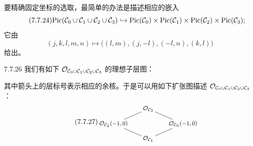 要精确固定坐标的选取，最简单的办法是描述相应的嵌入
\begin{equation}\tag{7.7.24}\label{eq:a4-7-7-24}
\mathrm{Pic}(\mathcal{C}_0\cup\mathcal{C}_1\cup\mathcal{C}_2\cup\mathcal{C}_3)\hookrightarrow\mathrm{Pic}(\mathcal{C}_0)\times\mathrm{Pic}(\mathcal{C}_1)\times\mathrm{Pic}(\mathcal{C}_2)\times\mathrm{Pic}(\mathcal{C}_3);
\end{equation}
它由
\begin{equation}\tag{7.7.25}\label{eq:a4-7-7-25}
(j,k,l,m,n)\mapsto\bigl((l,m),(j,-l),(-l,n),(k,l)\bigr)
\end{equation}
给出。

\begin{exam}{7.7.26}\label{thm:a4-7-7-26}
我们有如下 $\mathcal{O}_{\mathcal{C}_0\cup\mathcal{C}_1\cup\mathcal{C}_2\cup\mathcal{C}_3}$ 的理想子层图：
\begin{center}
\end{center}
其中箭头上的层标号表示相应的余核。于是可以用如下扩张图描述 $\mathcal{O}_{\mathcal{C}_0\cup\mathcal{C}_1\cup\mathcal{C}_2\cup\mathcal{C}_3}$：
\begin{equation}\tag{7.7.27}\label{eq:a4-7-7-27}
\begin{tikzpicture}[baseline=(current bounding box.center),every node/.style={font=\footnotesize, inner sep=2pt}]
\node (t) at (0,1.5) {$\OO_{\CC_3}$};
\node (l) at (-1.75,0.75) {$\OO_{\CC_2}(-1,0)$};
\node (r) at (1.75,0.75) {$\OO_{\CC_0}(-1,0)$};
\node (b) at (0,0) {$\OO_{\CC_1}$};
\draw (t)--(l); \draw (t)--(r); \draw (l)--(b); \draw (r)--(b);
\end{tikzpicture}

\end{equation}
\end{exam}

